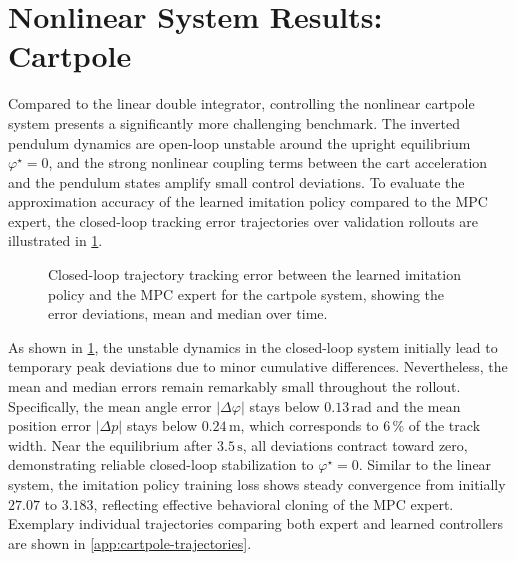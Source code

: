 \section{Nonlinear System Results: Cartpole}
\label{sec:results-nonlinear}

Compared to the linear double integrator, controlling the nonlinear cartpole system presents a significantly more challenging benchmark. 
The inverted pendulum dynamics are open-loop unstable around the upright equilibrium $\varphi^\star = 0$, 
and the strong nonlinear coupling terms between the cart acceleration and the pendulum states amplify small control deviations. 
To evaluate the approximation accuracy of the learned imitation policy compared to the MPC expert, the closed-loop tracking 
error trajectories over validation rollouts are illustrated in \cref{fig:cp-policy-error-bands}. 
\begin{figure}[htbp]
    \centering
    
    \caption[Closed-loop cartpole error bands]{
        Closed-loop trajectory tracking error between the learned imitation policy and the MPC expert for the cartpole system, 
        showing the error deviations, mean and median over time.}
    \label{fig:cp-policy-error-bands}
\end{figure}

As shown in \cref{fig:cp-policy-error-bands}, the unstable dynamics in the closed-loop system initially lead to temporary peak deviations 
due to minor cumulative differences. Nevertheless, the mean and median errors remain remarkably small throughout the rollout. 
Specifically, the mean angle error $|\Delta \varphi|$ stays below $0.13\,\text{rad}$ and the mean position error $|\Delta p|$ stays 
below $0.24\,\text{m}$, which corresponds to $6\,\%$ of the track width. 
Near the equilibrium after $3.5\,\text{s}$, all deviations contract toward zero, 
demonstrating reliable closed-loop stabilization to $\varphi^\star = 0$. 
Similar to the linear system, the imitation policy training loss shows steady convergence from initially $27.07$ to $3.183$, 
reflecting effective behavioral cloning of the MPC expert.
Exemplary individual trajectories comparing both expert and learned controllers are shown in \cref{app:cartpole-trajectories}.

